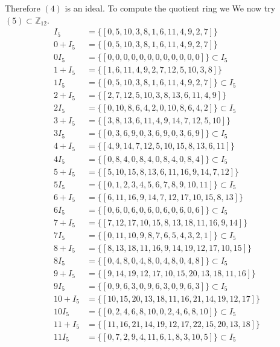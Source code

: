 \documentclass[11pt]{amsart}
\begin{document}
Therefore $(4)$ is an ideal.
To compute the quotient ring we
We now try $(5) \subset \mathbb{Z}_{12}$.
\begin{equation*}
\begin{aligned}
I_5 &= \{[0, 5, 10, 3, 8, 1, 6, 11, 4, 9, 2, 7]\} \\
0+ I_5 &= \{[0, 5, 10, 3, 8, 1, 6, 11, 4, 9, 2, 7]\}\\
0 I_5 &= \{[0, 0, 0, 0, 0, 0, 0, 0, 0, 0, 0, 0]\} \subset I_5 \\
1+ I_5 &= \{[1, 6, 11, 4, 9, 2, 7, 12, 5, 10, 3, 8]\}\\
1 I_5 &= \{[0, 5, 10, 3, 8, 1, 6, 11, 4, 9, 2, 7]\} \subset I_5 \\
2+ I_5 &= \{[2, 7, 12, 5, 10, 3, 8, 13, 6, 11, 4, 9]\}\\
2 I_5 &= \{[0, 10, 8, 6, 4, 2, 0, 10, 8, 6, 4, 2]\} \subset I_5 \\
3+ I_5 &= \{[3, 8, 13, 6, 11, 4, 9, 14, 7, 12, 5, 10]\}\\
3 I_5 &= \{[0, 3, 6, 9, 0, 3, 6, 9, 0, 3, 6, 9]\} \subset I_5 \\
4+ I_5 &= \{[4, 9, 14, 7, 12, 5, 10, 15, 8, 13, 6, 11]\}\\
4 I_5 &= \{[0, 8, 4, 0, 8, 4, 0, 8, 4, 0, 8, 4]\} \subset I_5 \\
5+ I_5 &= \{[5, 10, 15, 8, 13, 6, 11, 16, 9, 14, 7, 12]\}\\
5 I_5 &= \{[0, 1, 2, 3, 4, 5, 6, 7, 8, 9, 10, 11]\} \subset I_5 \\
6+ I_5 &= \{[6, 11, 16, 9, 14, 7, 12, 17, 10, 15, 8, 13]\}\\
6 I_5 &= \{[0, 6, 0, 6, 0, 6, 0, 6, 0, 6, 0, 6]\} \subset I_5 \\
7+ I_5 &= \{[7, 12, 17, 10, 15, 8, 13, 18, 11, 16, 9, 14]\}\\
7 I_5 &= \{[0, 11, 10, 9, 8, 7, 6, 5, 4, 3, 2, 1]\} \subset I_5 \\
8+ I_5 &= \{[8, 13, 18, 11, 16, 9, 14, 19, 12, 17, 10, 15]\}\\
8 I_5 &= \{[0, 4, 8, 0, 4, 8, 0, 4, 8, 0, 4, 8]\} \subset I_5 \\
9+ I_5 &= \{[9, 14, 19, 12, 17, 10, 15, 20, 13, 18, 11, 16]\}\\
9 I_5 &= \{[0, 9, 6, 3, 0, 9, 6, 3, 0, 9, 6, 3]\} \subset I_5 \\
10+ I_5 &= \{[10, 15, 20, 13, 18, 11, 16, 21, 14, 19, 12, 17]\}\\
10 I_5 &= \{[0, 2, 4, 6, 8, 10, 0, 2, 4, 6, 8, 10]\} \subset I_5 \\
11+ I_5 &= \{[11, 16, 21, 14, 19, 12, 17, 22, 15, 20, 13, 18]\}\\
11 I_5 &= \{[0, 7, 2, 9, 4, 11, 6, 1, 8, 3, 10, 5]\} \subset I_5 \\
\end{aligned}
\end{equation*}
\end{document}
